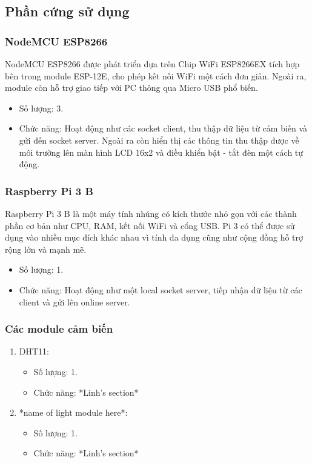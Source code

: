 \documentclass[12pt,titlepage,a4paper]{article}
\begin{document}
\subsection{Phần cứng sử dụng}
\subsubsection{NodeMCU ESP8266}
NodeMCU ESP8266 được phát triển dựa trên Chip WiFi ESP8266EX tích hợp bên trong module ESP-12E, cho phép kết nối WiFi một cách đơn giản. Ngoài ra, module còn hỗ trợ giao tiếp với PC thông qua Micro USB phổ biến. 
\begin{itemize}
\item Số lượng: 3.
\item Chức năng: Hoạt động như các socket client, thu thập dữ liệu từ cảm biến và gửi đến socket server. Ngoài ra còn hiển thị các thông tin thu thập được về môi trường lên màn hình LCD 16x2 và điều khiển bật - tắt đèn một cách tự động.
\end{itemize}
\subsubsection{Raspberry Pi 3 B}
Raspberry Pi 3 B là một máy tính nhúng có kích thước nhỏ gọn với các thành phần cơ bản như CPU, RAM, kết nối WiFi và cổng USB. Pi 3 có thể được sử dụng vào nhiều mục đích khác nhau vì tính đa dụng cũng như cộng đồng hỗ trợ rộng lớn và mạnh mẽ.
\begin{itemize}
\item Số lượng: 1.
\item Chức năng: Hoạt động như một local socket server, tiếp nhận dữ liệu từ các client và gửi lên online server.
\end{itemize}
\subsubsection{Các module cảm biến}
\begin{enumerate}
\item DHT11:
\begin{itemize}
\item Số lượng: 1.
\item Chức năng: *Linh's section*
\end{itemize}
\item *name of light module here*:
\begin{itemize}
\item Số lượng: 1.
\item Chức năng: *Linh's section*
\end{itemize}
\end{enumerate}
\end{document}
